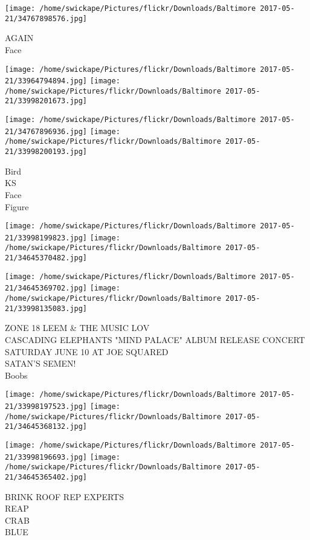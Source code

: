 \documentclass[10pt,letterpaper]{article}
\begin{document}
\vspace{0.25in}
\texttt{[image: /home/swickape/Pictures/flickr/Downloads/Baltimore 2017-05-21/34767898576.jpg]}

AGAIN\\
Face
\pagebreak

\texttt{[image: /home/swickape/Pictures/flickr/Downloads/Baltimore 2017-05-21/33964794894.jpg]}
\texttt{[image: /home/swickape/Pictures/flickr/Downloads/Baltimore 2017-05-21/33998201673.jpg]}

\texttt{[image: /home/swickape/Pictures/flickr/Downloads/Baltimore 2017-05-21/34767896936.jpg]}
\texttt{[image: /home/swickape/Pictures/flickr/Downloads/Baltimore 2017-05-21/33998200193.jpg]}

Bird\\
KS\\
Face\\
Figure
\pagebreak

\texttt{[image: /home/swickape/Pictures/flickr/Downloads/Baltimore 2017-05-21/33998199823.jpg]}
\texttt{[image: /home/swickape/Pictures/flickr/Downloads/Baltimore 2017-05-21/34645370482.jpg]}

\texttt{[image: /home/swickape/Pictures/flickr/Downloads/Baltimore 2017-05-21/34645369702.jpg]}
\texttt{[image: /home/swickape/Pictures/flickr/Downloads/Baltimore 2017-05-21/33998135083.jpg]}

ZONE 18 LEEM \& THE MUSIC LOV\\
CASCADING ELEPHANTS "MIND PALACE" ALBUM RELEASE CONCERT SATURDAY JUNE 10 AT JOE SQUARED\\
SATAN'S SEMEN!\\
Boobs
\pagebreak

\texttt{[image: /home/swickape/Pictures/flickr/Downloads/Baltimore 2017-05-21/33998197523.jpg]}
\texttt{[image: /home/swickape/Pictures/flickr/Downloads/Baltimore 2017-05-21/34645368132.jpg]}

\texttt{[image: /home/swickape/Pictures/flickr/Downloads/Baltimore 2017-05-21/33998196693.jpg]}
\texttt{[image: /home/swickape/Pictures/flickr/Downloads/Baltimore 2017-05-21/34645365402.jpg]}

BRINK ROOF REP EXPERTS\\
REAP\\
CRAB\\
BLUE
\pagebreak
\end{document}
